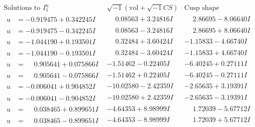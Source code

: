 \documentclass[1p]{elsarticle_modified}
\theoremstyle{definition}
\newcommand{\I}{\sqrt{-1}}
\begin{document}
$$\begin{array}{c|c|c}  
\text{Solutions to }I^u_{1}& \I (\text{vol} + \sqrt{-1}CS) & \text{Cusp shape}\\
 \hline 
\begin{aligned}
u &= -0.919475 + 0.342245 I\end{aligned}
 & \phantom{-}0.08563 + 3.24816 I & \phantom{-}2.86695 - 8.06640 I \\ \hline\begin{aligned}
u &= -0.919475 - 0.342245 I\end{aligned}
 & \phantom{-}0.08563 - 3.24816 I & \phantom{-}2.86695 + 8.06640 I \\ \hline\begin{aligned}
u &= -1.044190 + 0.193501 I\end{aligned}
 & \phantom{-}0.32484 + 3.60424 I & -1.15833 - 4.66740 I \\ \hline\begin{aligned}
u &= -1.044190 - 0.193501 I\end{aligned}
 & \phantom{-}0.32484 - 3.60424 I & -1.15833 + 4.66740 I \\ \hline\begin{aligned}
u &= \phantom{-}0.905641 + 0.075866 I\end{aligned}
 & -1.51462 - 0.22405 I & -6.40245 + 0.27111 I \\ \hline\begin{aligned}
u &= \phantom{-}0.905641 - 0.075866 I\end{aligned}
 & -1.51462 + 0.22405 I & -6.40245 - 0.27111 I \\ \hline\begin{aligned}
u &= -0.006041 + 0.904852 I\end{aligned}
 & -10.02580 - 2.42359 I & -2.65635 + 3.19391 I \\ \hline\begin{aligned}
u &= -0.006041 - 0.904852 I\end{aligned}
 & -10.02580 + 2.42359 I & -2.65635 - 3.19391 I \\ \hline\begin{aligned}
u &= \phantom{-}0.038465 + 0.899651 I\end{aligned}
 & -4.64353 + 8.98999 I & \phantom{-}1.72039 - 5.67712 I \\ \hline\begin{aligned}
u &= \phantom{-}0.038465 - 0.899651 I\end{aligned}
 & -4.64353 - 8.98999 I & \phantom{-}1.72039 + 5.67712 I \\ \hline\begin{aligned}

\end{aligned}
\end{array}$$
\end{document}
